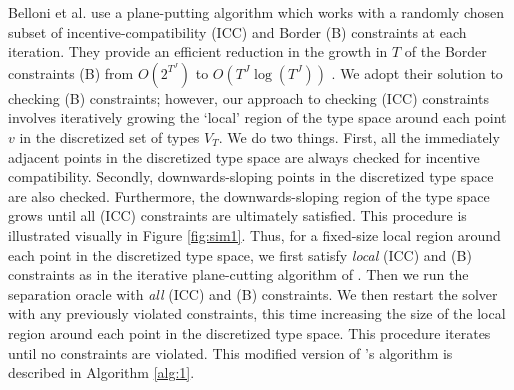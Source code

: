 Belloni et al. \autocite*{belloni2010multidimensional} use a plane-putting algorithm which works with a randomly chosen subset of incentive-compatibility (ICC) and Border (B) constraints at each iteration. They provide an efficient reduction in the growth in $T$ of the Border constraints (B) from $O(2^{T^J})$ to $O(T^J \log(T^J))$ \autocite[Lemma 10]{belloni2010multidimensional}. We adopt their solution to checking (B) constraints; however, our approach to checking (ICC) constraints involves iteratively growing the `local' region of the type space around each point $v$ in the discretized set of types $V_T$. We do two things. First, all the immediately adjacent points in the discretized type space are always checked for incentive compatibility. Secondly, downwards-sloping points in the discretized type space are also checked. Furthermore, the downwards-sloping region of the type space grows until all (ICC) constraints are ultimately satisfied. This procedure is illustrated visually in Figure \ref{fig:sim1}. Thus, for a fixed-size local region around each point in the discretized type space, we first satisfy \textit{local} (ICC) and (B) constraints as in the iterative plane-cutting algorithm of \autocite{belloni2010multidimensional}. Then we run the separation oracle with \textit{all} (ICC) and (B) constraints. We then restart the solver with any previously violated constraints, this time increasing the size of the local region around each point in the discretized type space. This procedure iterates until no constraints are violated. This modified version of \autocite{belloni2010multidimensional}'s algorithm is described in Algorithm \ref{alg:1}.

